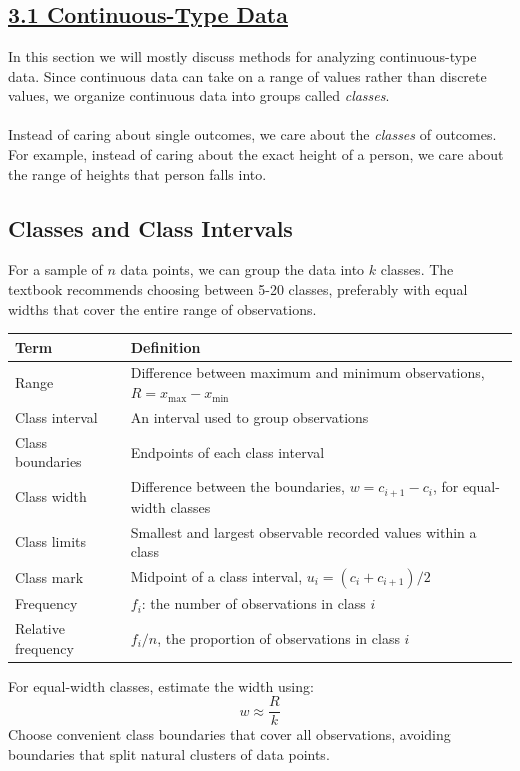 ﻿\documentclass[12pt]{article}
\begin{document}
\section*{}
\subsection*{\underline{3.1 Continuous-Type Data}}
In this section we will mostly discuss methods for analyzing continuous-type data. Since continuous data can take on a range of values rather than discrete values, we organize continuous data into groups called \textit{classes}.\\\\
Instead of caring about single outcomes, we care about the \textit{classes} of outcomes. For example, instead of caring about the exact height of a person, we care about the range of heights that person falls into.
\subsection*{Classes and Class Intervals}
For a sample of $n$ data points, we can group the data into $k$ classes. The textbook recommends choosing between 5-20 classes, preferably with equal widths that cover the entire range of observations. 
\begin{center}
    \renewcommand{\arraystretch}{1.5}
\begin{tabular}{p{3.5cm} p{10cm}}
\hline
\textbf{Term} & \textbf{Definition} \\
\hline
Range & Difference between maximum and minimum observations, $R=x_{\max}-x_{\min}$ \\

Class interval & An interval used to group observations \\

Class boundaries & Endpoints of each class interval \\

Class width & Difference between the boundaries, $w=c_{i+1}-c_i$, for equal-width classes \\

Class limits & Smallest and largest observable recorded values within a class \\

Class mark & Midpoint of a class interval, $u_i=(c_i+c_{i+1})/2$ \\

Frequency & $f_i$: the number of observations in class $i$ \\

Relative frequency & $f_i/n$, the proportion of observations in class $i$ \\
\hline
\end{tabular}
\end{center}
For equal-width classes, estimate the width using:
\[
w\approx\frac{R}{k}
\]
Choose convenient class boundaries that cover all observations, avoiding boundaries that split natural clusters of data points.
\end{document}

